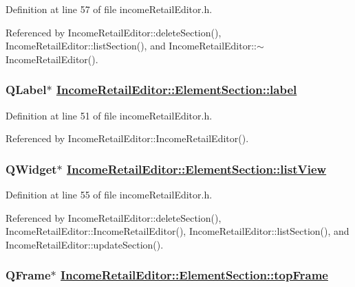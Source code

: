 Definition at line 57 of file income\-Retail\-Editor.h.

Referenced by Income\-Retail\-Editor::delete\-Section(), Income\-Retail\-Editor::list\-Section(), and Income\-Retail\-Editor::$\sim$Income\-Retail\-Editor().\hypertarget{structIncomeRetailEditor_1_1ElementSection_o2}{
\subsubsection[label]{\setlength{\rightskip}{0pt plus 5cm}QLabel$\ast$ \hyperlink{structIncomeRetailEditor_1_1ElementSection_o2}{Income\-Retail\-Editor::Element\-Section::label}}}
\label{structIncomeRetailEditor_1_1ElementSection_o2}


Definition at line 51 of file income\-Retail\-Editor.h.

Referenced by Income\-Retail\-Editor::Income\-Retail\-Editor().\hypertarget{structIncomeRetailEditor_1_1ElementSection_o6}{
\subsubsection[listView]{\setlength{\rightskip}{0pt plus 5cm}QWidget$\ast$ \hyperlink{structIncomeRetailEditor_1_1ElementSection_o6}{Income\-Retail\-Editor::Element\-Section::list\-View}}}
\label{structIncomeRetailEditor_1_1ElementSection_o6}


Definition at line 55 of file income\-Retail\-Editor.h.

Referenced by Income\-Retail\-Editor::delete\-Section(), Income\-Retail\-Editor::Income\-Retail\-Editor(), Income\-Retail\-Editor::list\-Section(), and Income\-Retail\-Editor::update\-Section().\hypertarget{structIncomeRetailEditor_1_1ElementSection_o0}{
\subsubsection[topFrame]{\setlength{\rightskip}{0pt plus 5cm}QFrame$\ast$ \hyperlink{structIncomeRetailEditor_1_1ElementSection_o0}{Income\-Retail\-Editor::Element\-Section::top\-Frame}}}
\label{structIncomeRetailEditor_1_1ElementSection_o0}


